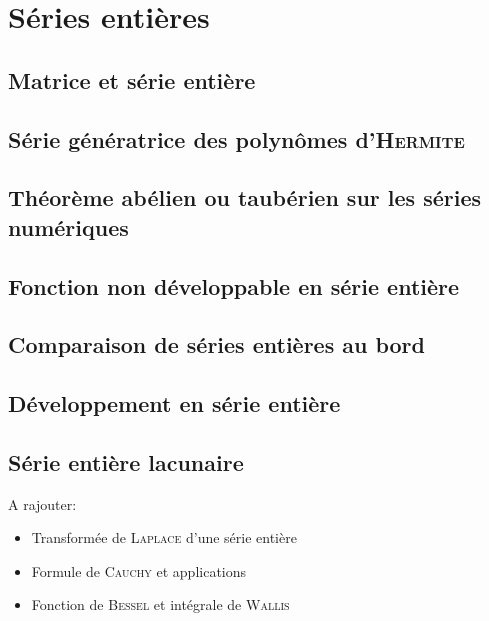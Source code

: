 \chapter{Séries entières}

\section{Matrice et série entière}


\section{Série génératrice des polynômes d'\textsc{Hermite}}


\section{Théorème abélien ou taubérien sur les séries numériques}


\section{Fonction non développable en série entière}


\section{Comparaison de séries entières au bord}


\section{Développement en série entière}


\section{Série entière lacunaire}


A rajouter:
\begin{itemize}
    \item Transformée de \textsc{Laplace} d'une série entière
    \item Formule de \textsc{Cauchy} et applications
    \item Fonction de \textsc{Bessel} et intégrale de \textsc{Wallis}
\end{itemize}
